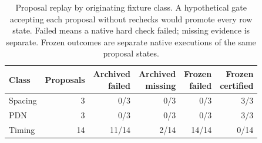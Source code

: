 \begin{table}[htbp]\centering\small\setlength{\tabcolsep}{4pt}
\caption{Proposal replay by originating fixture class. A hypothetical gate accepting each proposal without rechecks would promote every row state. Failed means a native hard check failed; missing evidence is separate. Frozen outcomes are separate native executions of the same proposal states.}\label{tab:classreplay}
\begin{tabular}{@{}lrrrrr@{}}\toprule
Class & Proposals & \shortstack{Archived\\failed} & \shortstack{Archived\\missing} & \shortstack{Frozen\\failed} & \shortstack{Frozen\\certified} \\
\midrule
Spacing & 3 & 0/3 & 0/3 & 0/3 & 3/3 \\
PDN & 3 & 0/3 & 0/3 & 0/3 & 3/3 \\
Timing & 14 & 11/14 & 2/14 & 14/14 & 0/14 \\
\bottomrule\end{tabular}\end{table}
